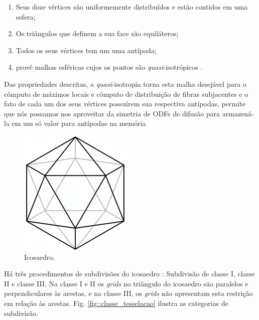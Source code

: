 \documentclass[
    12pt,                %
    oneside,            %
    a4paper,            %
    english,            %
    french,                %
    spanish,            %
    brazil                %
    ]{abntex2}
\begin{document}
\begin{enumerate}
    \item Seus doze vértices são uniformemente distribuídos e estão contidos em uma esfera;
    \item Os triângulos que definem a sua face são equiláteros;
    \item Todos os seus vértices tem um uma antípoda;
    \item provê malhas esféricas cujos os pontos são \textit{quasi}-isotrópicos \cite{popko2012}.
\end{enumerate}

Das propriedades descritas, a \textit{quasi}-isotropia torna esta malha desejável para o cômputo de máximos locais e cômputo de distribuição de fibras subjacentes \cite{descoteaux2007} e o fato de cada um dos seus vértices possuírem sua respectiva antípodas, permite que nós possamos nos aproveitar da simetria de ODFs de difusão para armazená-la em um só valor para antípodas na memória

\begin{figure}[ht]
    \centering
    \includegraphics[width=.3\linewidth, angle=0]{figs/HARDI/icosaedro.png}
    \caption{
    Icosaedro.
    }
    \label{fig::icosaedro}
   \hspace{1pt}
\end{figure}

Há três procedimentos de subdivisões do icosaedro \cite{popko2012}: Subdivisão de classe I, classe II e classe III. Na classe I e II os \textit{grids} no triângulo do icosaedro são paralelos e perpendiculares às arestas, e na classe III, os \textit{grids} não apresentam esta restrição em relação às arestas. Fig. \ref{fig::classe_tesselacao} ilustra as categorias de subdivisão.
\end{document}
